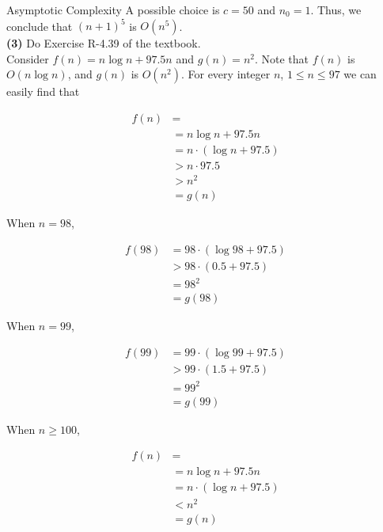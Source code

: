 \begin{homeworkProblem}{Asymptotic Complexity}
    A possible choice is $c = 50$ and $n_{0} = 1$. Thus, we conclude that $(n + 1)^5$
    is $O(n^5)$.
    \\

    \textbf{(3)} Do Exercise R-4.39 of the textbook.
    \\

    Consider $f(n) = n \log n + 97.5n$ and $g(n) = n^2$. Note that $f(n)$ is $O(n\log n)$,
    and $g(n)$ is $O(n^2)$. For every integer \(n\), \(1 \leq n \leq 97\) we can easily
    find that 

    \[
        \begin{split}
            f(n) &=
            \\
            &= n \log n + 97.5n
            \\
            &= n \cdot (\log n + 97.5)
            \\
            &> n \cdot 97.5
            \\
            &> n^2
            \\
            &= g(n)
        \end{split}
    \]

    \pagebreak

    When $n = 98$,

    \[
        \begin{split}
            f(98) &= 98 \cdot (\log 98 + 97.5)
            \\
            &> 98 \cdot (0.5 + 97.5)
            \\
            &= 98^2
            \\
            &= g(98)
        \end{split}
    \]

    When $n = 99$,

    \[
        \begin{split}
            f(99) &= 99 \cdot (\log 99 + 97.5)
            \\
            &> 99 \cdot (1.5 + 97.5)
            \\
            &= 99^2
            \\
            &= g(99)
        \end{split}
    \]

    When $n \geq 100$,

    \[
        \begin{split}
            f(n) &=
            \\
            &= n \log n + 97.5n
            \\
            &= n \cdot (\log n + 97.5)
            \\
            &< n^2
            \\
            &= g(n)
        \end{split}
    \]


\end{homeworkProblem}
